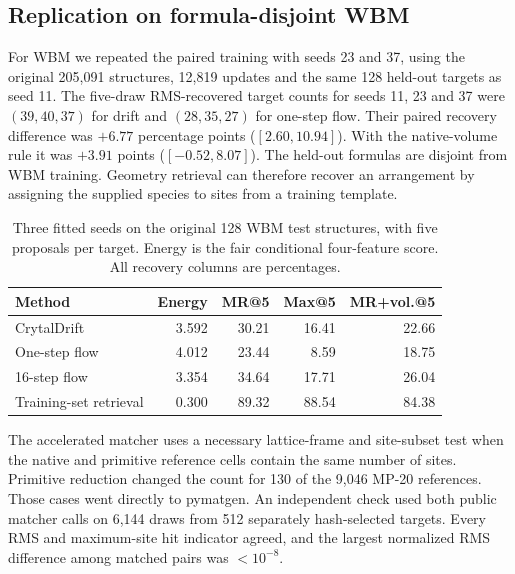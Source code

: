 



\subsection{Replication on formula-disjoint WBM}
For WBM we repeated the paired training with seeds 23 and 37, using the original 205,091 structures, 12,819 updates and the same 128 held-out targets as seed 11. The five-draw RMS-recovered target counts for seeds 11, 23 and 37 were $(39,40,37)$ for drift and $(28,35,27)$ for one-step flow. Their paired recovery difference was $+6.77$ percentage points ($[2.60,10.94]$). With the native-volume rule it was $+3.91$ points ($[-0.52,8.07]$). The held-out formulas are disjoint from WBM training. Geometry retrieval can therefore recover an arrangement by assigning the supplied species to sites from a training template.

\begin{table}[!htbp]\centering\small
\caption{Three fitted seeds on the original 128 WBM test structures, with five proposals per target. Energy is the fair conditional four-feature score. All recovery columns are percentages.}\label{t:wbm-revision}
\begin{tabular}{lrrrr}\hline Method & Energy & MR@5 & Max@5 & MR+vol.@5\\\hline
CrytalDrift & 3.592 & 30.21 & 16.41 & 22.66\\
One-step flow & 4.012 & 23.44 & 8.59 & 18.75\\
16-step flow & 3.354 & 34.64 & 17.71 & 26.04\\
Training-set retrieval & 0.300 & 89.32 & 88.54 & 84.38\\
\hline\end{tabular}\end{table}

The accelerated matcher uses a necessary lattice-frame and site-subset test when the native and primitive reference cells contain the same number of sites. Primitive reduction changed the count for 130 of the 9,046 MP-20 references. Those cases went directly to pymatgen. An independent check used both public matcher calls on 6,144 draws from 512 separately hash-selected targets. Every RMS and maximum-site hit indicator agreed, and the largest normalized RMS difference among matched pairs was $<10^{-8}$.
